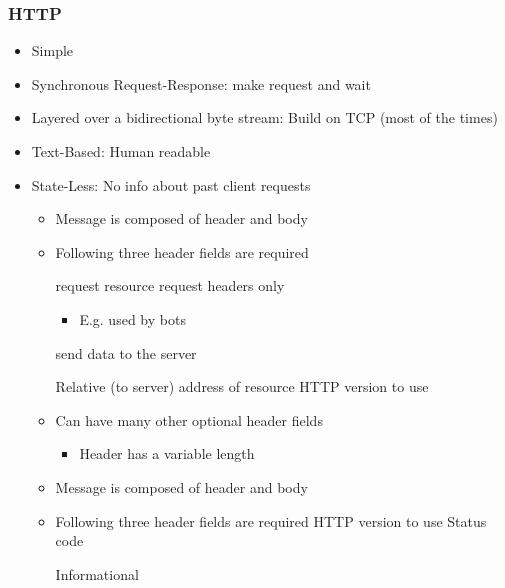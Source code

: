 \subsubsection{HTTP}
\begin{itemize}
    \item Simple
    \item Synchronous Request-Response: make request and wait
    \item Layered over a bidirectional byte stream: Build on TCP (most of the times)
    \item Text-Based: Human readable
    \item State-Less: No info about past client requests
        \begin{itemize}
            \item Message is composed of header and body
            \item Following three header fields are required
                \begin{itemize}
                     request resource
                     request headers only
                        \begin{itemize}
                            \item E.g. used by bots
                        \end{itemize}
                     send data to the server
                \end{itemize}
             Relative (to server) address of resource
             HTTP version to use
            \item Can have many other optional header fields
                \begin{itemize}
                    \item Header has a variable length
                \end{itemize}
        \end{itemize}
        \begin{itemize}
            \item Message is composed of header and body
            \item Following three header fields are required
             HTTP version to use
             Status code
                \begin{itemize}
                     Informational

\end{itemize}
\end{itemize}
\end{itemize}
